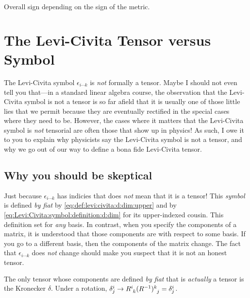 \begin{subappendices}
Overall sign depending on the sign of the metric. 


\section{The Levi-Civita Tensor versus Symbol}
\label{sec:Levi:Civita:Tensor:vs:Symbol}

The Levi-Civita symbol $\epsilon_{i\cdots k}$ is \emph{not} formally a tensor. Maybe I should not even tell you that---in a standard linear algebra course, the observation that the Levi-Civita symbol is not a tensor is so far afield that it is usually one of those little lies that we permit because they are eventually rectified in the special cases where they need to be. However, the cases where it matters that the Levi-Civita symbol is \emph{not} tensorial are often those that show up in physics! As such, I owe it to you to explain why physicists say the Levi-Civita symbol is not a tensor, and why we go out of our way to define a bona fide Levi-Civita tensor.

\subsection{Why you should be skeptical} 

Just because $\epsilon_{i\cdots k}$ has indicies that does \emph{not} mean that it is a tensor! This \emph{symbol} is defined \emph{by fiat} by \eqref{eq:def:levi:civita:d:dim:upper} and by \eqref{eq:Levi:Civita:symbol:definition:d:dim} for its upper-indexed cousin. This definition set for \emph{any} basis. In contrast, when you specify the components of a matrix, it is understood that those components are with respect to some basis. If you go to a different basis, then the components of the matrix change. The fact that $\epsilon_{i\cdots k}$ does \emph{not} change should make you suspect that it is not an honest tensor.
\begin{example}
The only tensor whose components are defined \emph{by fiat} that is \emph{actually} a tensor is the Kronecker $\delta$. Under a rotation, $\delta^i_j \to R\aij{i}{k}(R\inv)\aij{k}{j} = \delta^i_j$.
\end{example}


\end{subappendices}
